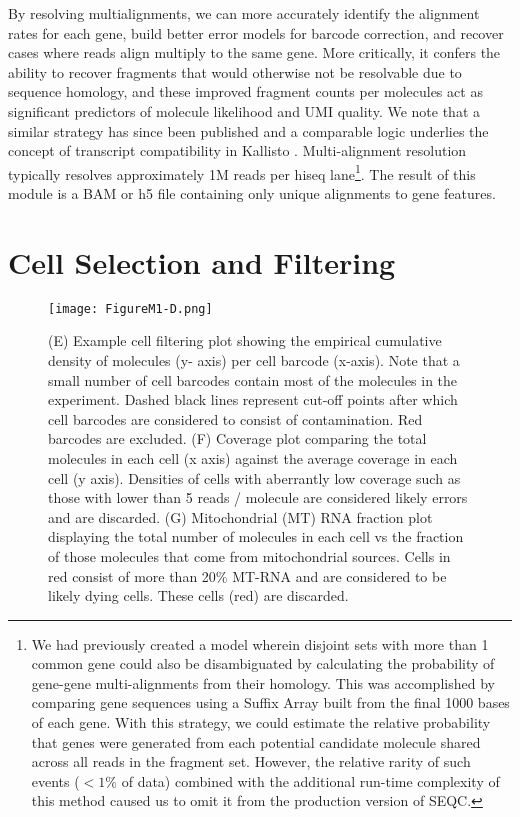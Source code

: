 By resolving multialignments, we can more accurately identify the alignment rates for each gene, build better error models for barcode correction, and recover cases where reads align multiply to the same gene. 
More critically, it confers the ability to recover fragments that would otherwise not be resolvable due to sequence homology, and these improved fragment counts per molecules act as significant predictors of molecule likelihood and UMI quality. 
We note that a similar strategy has since been published \citep{Klein2015} and a comparable logic underlies the concept of transcript compatibility in Kallisto \citep{Bray2016}.
Multi-alignment resolution typically resolves approximately 1M reads per hiseq lane\footnote{We had previously created a model wherein disjoint sets with more than 1 common gene could also be disambiguated by calculating the probability of gene-gene multi-alignments from their homology. This was accomplished by comparing gene sequences using a Suffix Array built from the final 1000 bases of each gene. With this strategy, we could estimate the relative probability that genes were generated from each potential candidate molecule shared across all reads in the fragment set. However, the relative rarity of such events ($<1\%$ of data) combined with the additional run-time complexity of this method caused us to omit it from the production version of SEQC\@.}. 
The result of this module is a BAM or h5 file containing only unique alignments to gene features.
 
\section{Cell Selection and Filtering}

\begin{figure}
\centering
\texttt{[image: FigureM1-D.png]}
\caption{(E) Example cell filtering plot showing the empirical cumulative density of molecules (y-
axis) per cell barcode (x-axis). Note that a small number of cell barcodes contain most of
the molecules in the experiment. Dashed black lines represent cut-off points after which
cell barcodes are considered to consist of contamination. Red barcodes are excluded.
(F) Coverage plot comparing the total molecules in each cell (x axis) against the average
coverage in each cell (y axis). Densities of cells with aberrantly low coverage such as
those with lower than 5 reads / molecule are considered likely errors and are discarded.
(G) Mitochondrial (MT) RNA fraction plot displaying the total number of molecules in
each cell vs the fraction of those molecules that come from mitochondrial sources. Cells
in red consist of more than 20\% MT-RNA and are considered to be likely dying cells.
These cells (red) are discarded.}
\label{fig:m1d}
\end{figure}

